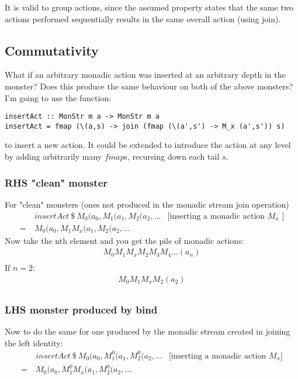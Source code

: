 \documentclass{article}
\begin{document}
It is valid to group actions, since the assumed property states that the same two actions performed sequentially results in the same overall action (using join).

\subsection{Commutativity}

What if an arbitrary monadic action was inserted at an arbitrary depth in the monster? Does this produce the same behaviour on both of the above monsters?\\

I'm going to use the function:
\begin{lstlisting}
insertAct :: MonStr m a -> MonStr m a
insertAct = fmap (\(a,s) -> join (fmap (\(a',s') -> M_x (a',s')) s)
\end{lstlisting}
to insert a new action. It could be extended to introduce the action at any level by adding arbitrarily many $fmap$s, recursing down each tail $s$.

\subsubsection{RHS "clean" monster}

For "clean" monsters (ones not produced in the monadic stream join operation)
\begin{align*}
& insertAct\ \$\ M_0(a_0, M_1(a_1, M_2 (a_2,... & \text{[inserting a monadic action $M_x$ ]}\\
=\ & M_0(a_0, M_1M_x(a_1, M_2 (a_2,... 
\end{align*}
Now take the nth element and you get the pile of monadic actions:
\begin{align*}
M_0M_1M_xM_2M_3M_4... (a_n)\\
\end{align*}
If $n = 2$:
\begin{align*}
M_0M_1M_xM_2 (a_2)\\
\end{align*}

\subsubsection{LHS monster produced by bind}

Now to do the same for one produced by the monadic stream created in joining the left identity:
\begin{align*}
& insertAct\ \$\ M_0(a_0, M^0_1(a_1, M^0_2 (a_2,... & \text{[inserting a monadic action $M_x$]}\\
=\ & M_0(a_0, M^0_1M_x(a_1, M^0_2 (a_2,... \\
\end{align*}
\end{document}
